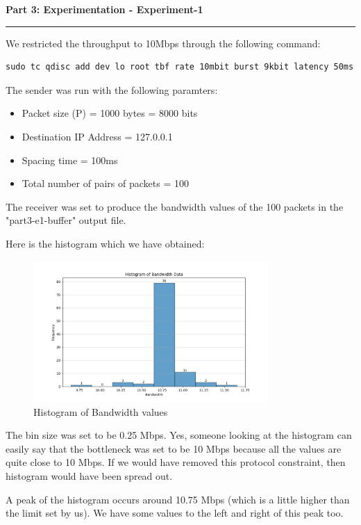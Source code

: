 \documentclass[a4paper,12pt]{article}
\newenvironment{solution}[2][]{%
    \begin{mdframed}[linecolor=blue!70!black, linewidth=2pt, roundcorner=10pt, backgroundcolor=yellow!10!white, skipabove=12pt, skipbelow=12pt]%
        \textbf{\large #2}
        \par\noindent\rule{\textwidth}{0.4pt}
}{
    \end{mdframed}
}
\begin{document}
\begin{solution}{Part 3: Experimentation - Experiment-1}
    We restricted the throughput to 10Mbps through the following command:
\begin{lstlisting}[caption=Restricting the throughput to 10Mbps]
sudo tc qdisc add dev lo root tbf rate 10mbit burst 9kbit latency 50ms
\end{lstlisting}

The sender was run with the following paramters:
\begin{itemize}
    \item Packet size (P) = 1000 bytes = 8000 bits
    \item Destination IP Address = 127.0.0.1
    \item Spacing time = 100ms
    \item Total number of pairs of packets = 100
\end{itemize}

The receiver was set to produce the bandwidth values of the 100 packets in the "part3-e1-buffer" output file.


Here is the histogram which we have obtained:

\begin{figure}[H]
    \centering
    \includegraphics[width=0.8\textwidth]{histograms/bandwidth_histogram.png}
    \caption{Histogram of Bandwidth values}
\end{figure}


The bin size was set to be 0.25 Mbps. Yes, someone looking at the histogram can easily say that the bottleneck was set to be 10 Mbps because all the values are quite close to 10 Mbps. If we would have removed this protocol constraint, then histogram would have been spread out.


A peak of the histogram occurs around 10.75 Mbps (which is a little higher than the limit set by us). We have some values to the left and right of this peak too.
\end{solution}
\end{document}
